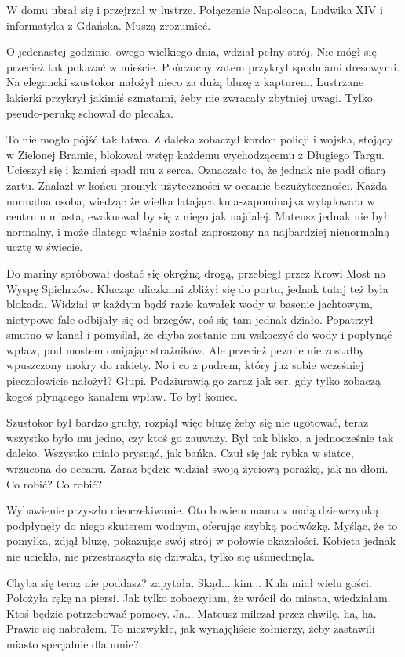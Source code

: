 W domu ubrał się i przejrzał w lustrze.
Połączenie Napoleona, Ludwika XIV i informatyka z Gdańska.
Muszą zrozumieć.

O jedenastej godzinie, owego wielkiego dnia, wdział pełny strój.
Nie mógł się przecież tak pokazać w mieście.
Pończochy zatem przykrył spodniami dresowymi.
Na elegancki szustokor nałożył nieco za dużą bluzę z kapturem.
Lustrzane lakierki przykrył jakimiś szmatami, żeby nie zwracały zbytniej uwagi.
Tylko pseudo-perukę schował do plecaka.

To nie mogło pójść tak łatwo.
Z daleka zobaczył kordon policji i wojska, stojący w Zielonej Bramie, blokował wstęp każdemu wychodzącemu z Długiego Targu.
Ucieszył się i kamień spadł mu z serca. Oznaczało to, że jednak nie padł ofiarą żartu.
Znalazł w końcu promyk użyteczności w oceanie bezużyteczności. Każda normalna osoba, wiedząc że wielka latająca kula-zapominajka wylądowała w centrum miasta,
ewakuował by się z niego jak najdalej. 
Mateusz jednak nie był normalny, i może dlatego właśnie został zaproszony na najbardziej nienormalną ucztę w świecie.

Do mariny spróbował dostać się okrężną drogą, przebiegł przez Krowi Most na Wyspę Spichrzów.
Klucząc uliczkami zbliżył się do portu, jednak tutaj też była blokada.
Widział w każdym bądź razie kawałek wody w basenie jachtowym, nietypowe fale odbijały się od brzegów, coś się tam jednak działo.
Popatrzył smutno w kanał i pomyślał, że chyba zostanie mu wskoczyć do wody i popłynąć wpław, pod mostem omijając strażników.
Ale przecież pewnie nie zostałby wpuszczony mokry do rakiety.
No i co z pudrem, który już sobie wcześniej pieczołowicie nałożył?
Głupi. Podziurawią go zaraz jak ser, gdy tylko zobaczą kogoś płynącego kanałem wpław.
To był koniec.

Szustokor był bardzo gruby, rozpiął więc bluzę żeby się nie ugotować, teraz wszystko było mu jedno, czy ktoś go zauważy.
Był tak blisko, a jednocześnie tak daleko. Wszystko miało prysnąć, jak bańka.
Czuł się jak rybka w siatce, wrzucona do oceanu.
Zaraz będzie widział swoją życiową porażkę, jak na dłoni.
Co robić? Co robić?

Wybawienie przyszło nieoczekiwanie.
Oto bowiem mama z małą dziewczynką podpłynęły do niego skuterem wodnym, oferując szybką podwózkę.
Myśląc, że to pomyłka, zdjął bluzę, pokazując swój strój w połowie okazałości.
Kobieta jednak nie uciekła, nie przestraszyła się dziwaka, tylko się uśmiechnęła.

\begin{dialogue}
\ds{} Chyba się teraz nie poddasz? \dm{} zapytała.
\ds{} Skąd... kim...
\ds{} Kula miał wielu gości. \dm{} Położyła rękę na piersi. \dm{} Jak tylko zobaczyłam, że wrócił do miasta, wiedziałam. Ktoś będzie potrzebować pomocy.
\ds{} Ja... \dm{} Mateusz milczał przez chwilę. \dm{} ha, ha. Prawie się nabrałem.
To niezwykłe, jak wynajęliście żołnierzy, żeby zastawili miasto specjalnie dla mnie?
\end{dialogue}

